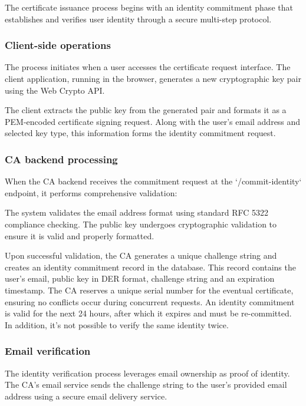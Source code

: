 The certificate issuance process begins with an identity commitment phase that 
establishes and verifies user identity through a secure multi-step protocol.

\subsubsection{Client-side operations}

The process initiates when a user accesses the certificate request interface. 
The client application, running in the browser, generates a new cryptographic 
key pair using the Web Crypto API. 

The client extracts the public key from the generated pair and formats it as 
a PEM-encoded certificate signing request. Along with the user's email address 
and selected key type, this information forms the identity commitment request.

\subsubsection{CA backend processing}

When the CA backend receives the commitment request at the `/commit-identity` 
endpoint, it performs comprehensive validation:

The system validates the email address format using standard RFC 5322 compliance 
checking. The public key undergoes cryptographic validation 
to ensure it is valid and properly formatted.

Upon successful validation, the CA generates a unique challenge string and creates 
an identity commitment record in the database. This record contains the user's 
email, public key in DER format, challenge string and an 
expiration timestamp. The CA reserves a unique serial number for the eventual 
certificate, ensuring no conflicts occur during concurrent requests. An identity
commitment is valid for the next 24 hours, after which it expires and must be 
re-committed. In addition, it's not possible to verify the same identity twice.

\subsubsection{Email verification}

The identity verification process leverages email ownership as proof of identity. 
The CA's email service sends the challenge string to the user's provided email 
address using a secure email delivery service.

